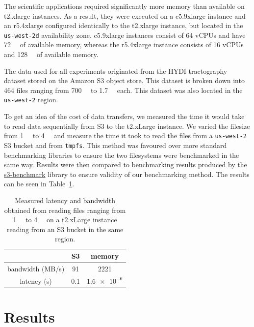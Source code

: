 The scientific applications required significantly more memory than available on
t2.xlarge instances. As a result, they were executed on a c5.9xlarge instance
and an r5.4xlarge configured identically to the t2.xlarge instance, but located
in the \texttt{us-west-2d} availability zone. c5.9xlarge instances consist of 64
vCPUs and have \SI{72}{\gibi\byte} of available memory, whereas the r5.4xlarge
instance consists of 16 vCPUs and \SI{128}{\gibi\byte} of available memory. 

The data used for all experiments originated from the HYDI tractography dataset
stored on the Amazon S3 object store. This dataset is broken down into 464 files
ranging from \SI{700}{\mebi\byte} to \SI{1.7}{\gibi\byte} each. This dataset was
also located in the \texttt{us-west-2} region.

To get an idea of the cost of data transfers, we measured the time it would take
to read data sequentially from S3 to the t2.xLarge instance. We varied the
filesize from \SI{1}{\kibi\byte} to \SI{4}{\gibi\byte} and measure the time it
took to read the files from a \texttt{us-west-2} S3 bucket and from
\texttt{tmpfs}. This method was favoured over more standard benchmarking
libraries to ensure the two filesystems were benchmarked in the same way.
Results were then compared to benchmarking results produced by the
\href{https://github.com/dvassallo/s3-benchmark}{s3-benchmark} library to ensure
validity of our benchmarking method. The results can be seen in
Table~\ref{table:benchmarks}.


\begin{table}
\caption{Measured latency and bandwidth obtained from reading files ranging from
\SI{1}{\kibi\byte} to \SI{4}{\gibi\byte} on a t2.xLarge instance reading from an
S3 bucket in the same region.}
\centering
\begin{tabular}{| c | c | c| }
\cline{2-3}
  \multicolumn{1}{c|}{}& S3 & memory \\ 
  \hline
 bandwidth (MB/s) & 91 & 2221 \\  
 latency (s) & 0.1 & $\num{1.6e-6}$ \\
 \hline
\end{tabular}
\label{table:benchmarks}
\end{table}


\section{Results}
